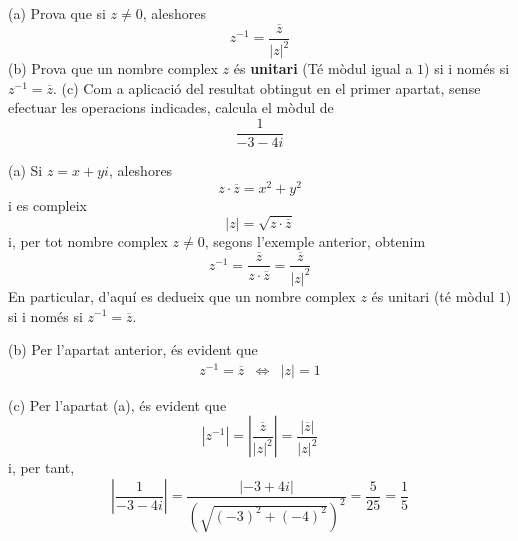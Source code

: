 \begin{exemple}
(a) Prova que si $z\neq 0$, aleshores
\begin{equation*}
z^{-1}=\frac{\overline{z}}{\left\vert z\right\vert ^{2}}
\end{equation*}
(b) Prova que un nombre complex $z$ és \textbf{unitari} (Té mòdul igual a $1$) si i només si $z^{-1}=\overline{z}$. (c) Com a aplicació del resultat obtingut en el primer apartat, sense efectuar les
operacions indicades, calcula el mòdul de
\begin{equation*}
\frac{1}{-3-4i}
\end{equation*}
\end{exemple}

\begin{solucio}
(a) Si $z=x+yi$, aleshores
\begin{equation*}
z\cdot \overline{z}=x^{2}+y^{2}
\end{equation*}
i es compleix
\begin{equation*}
\left\vert z\right\vert =\sqrt{z\cdot \overline{z}}
\end{equation*}
i, per tot nombre complex $z\neq 0$, segons l’exemple anterior,
obtenim
\begin{equation*}
z^{-1}=\frac{\overline{z}}{z\cdot \overline{z}}=\frac{\overline{z}}{
\left\vert z\right\vert ^{2}}
\end{equation*}
En particular, d’aquí es dedueix que un nombre complex $z$ és
unitari (té mòdul $1$) si i només si $z^{-1}=\overline{z}$.

(b) Per l’apartat anterior, és evident que
\begin{equation*}
\begin{array}{lll}
z^{-1}=\overline{z} & \Longleftrightarrow & \left\vert z\right\vert =1
\end{array}
\end{equation*}

(c) Per l’apartat (a), és evident que
\begin{equation*}
\left\vert z^{-1}\right\vert =\left\vert \frac{\overline{z}}{\left\vert
z\right\vert ^{2}}\right\vert =\frac{\left\vert \overline{z}\right\vert }{
\left\vert z\right\vert ^{2}}
\end{equation*}
i, per tant,
\begin{equation*}
\left\vert \frac{1}{-3-4i}\right\vert =\frac{\left\vert -3+4i\right\vert }{\left( \sqrt{
(-3)^{2}+(-4)^{2}}\right) ^{2}}=\frac{5}{25}=\frac{1}{5}
\end{equation*}
\end{solucio}

